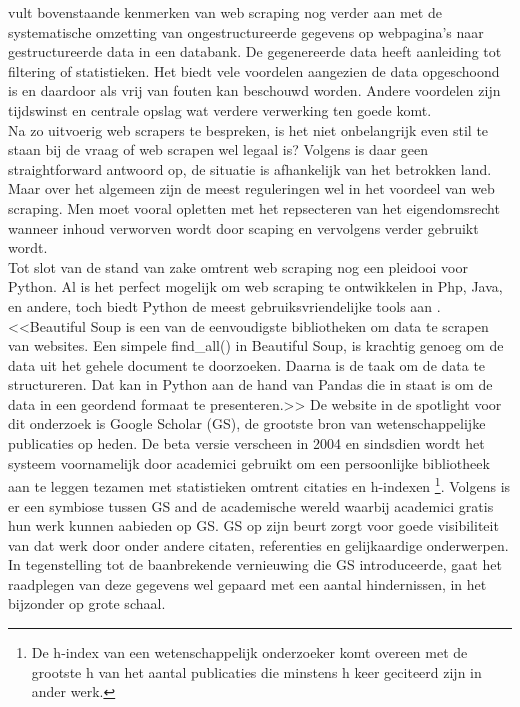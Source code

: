 \textcite{Singrodia2019} vult bovenstaande kenmerken van web scraping nog verder aan met de systematische omzetting van ongestructureerde gegevens op webpagina's naar gestructureerde data in een databank. De gegenereerde data heeft aanleiding tot filtering of statistieken. Het biedt vele voordelen aangezien de data opgeschoond is en daardoor als vrij van fouten kan beschouwd worden. Andere voordelen zijn tijdswinst en centrale opslag wat verdere verwerking ten goede komt.
\\
Na zo uitvoerig web scrapers te bespreken, is het niet onbelangrijk even stil te staan bij de vraag of web scrapen wel legaal is? Volgens \textcite{EPSI2015} is daar geen straightforward antwoord op, de situatie is afhankelijk van het betrokken land. Maar over het algemeen zijn de meest reguleringen wel in het voordeel van web scraping. Men moet vooral opletten met het repsecteren van het eigendomsrecht wanneer inhoud verworven wordt door scaping en vervolgens verder gebruikt wordt.\\
Tot slot van de stand van zake omtrent web scraping nog een pleidooi voor Python. Al is het perfect mogelijk om web scraping te ontwikkelen in Php, Java, en andere, toch biedt Python de meest gebruiksvriendelijke tools aan \textcite{Kumar2023}. <<Beautiful Soup is een van de eenvoudigste bibliotheken om data te scrapen van websites. Een simpele find\_all() in Beautiful Soup, is krachtig genoeg om de data uit het gehele document te doorzoeken. Daarna is de taak om de data te structureren. Dat kan in Python aan de hand van Pandas die in staat is om de data in een geordend formaat te presenteren.>>
De website in de spotlight voor dit onderzoek is Google Scholar (GS), de grootste bron van wetenschappelijke publicaties op heden. De beta versie verscheen in 2004 en sindsdien wordt het systeem voornamelijk door academici gebruikt om een persoonlijke bibliotheek aan te leggen tezamen met statistieken omtrent citaties en h-indexen \footnote{De h-index van een wetenschappelijk onderzoeker komt overeen met de grootste h van het aantal publicaties die minstens h keer geciteerd zijn in ander werk.}. Volgens \autocite{Oh2019} is er een symbiose tussen GS and de academische wereld waarbij academici gratis hun werk kunnen aabieden op GS. GS op zijn beurt zorgt voor goede visibiliteit van dat werk door onder andere citaten, referenties en gelijkaardige onderwerpen. In tegenstelling tot de baanbrekende vernieuwing die GS introduceerde, gaat het raadplegen van deze gegevens wel gepaard met een aantal hindernissen, in het bijzonder op grote schaal.\\
